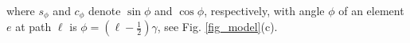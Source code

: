 \documentclass[10pt,letterpaper,journal,final,twoside,twocolumn,nofonttune]{IEEEtran}
\begin{document}
where $s_\phi$ and $c_\phi$ denote $\sin\phi$ and $\cos\phi$, respectively, with angle $\phi$ of an element $e$ at path $\ell$ is $\phi=(\ell-\frac{1}{2})\gamma$, see Fig. \ref{fig_model}(c).
\ifCLASSOPTIONcaptionsoff
  \newpage
\fi

%
%
\end{document}
